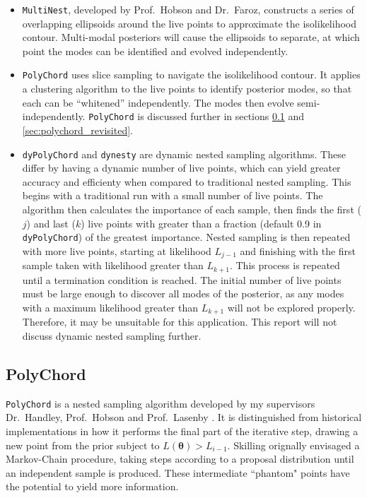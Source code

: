 \documentclass{article}
\begin{document}
\begin{itemize}
  \item \texttt{MultiNest}, developed by Prof.~Hobson and Dr.~Faroz, constructs a series of overlapping ellipsoids around the live points to approximate the isolikelihood contour. Multi-modal posteriors will cause the ellipsoids to separate, at which point the modes can be identified and evolved independently. 
  \item \texttt{PolyChord} uses slice sampling to navigate the isolikelihood contour. It applies a clustering algorithm to the live points to identify posterior modes, so that each can be ``whitened'' independently. The modes then evolve semi-independently. \texttt{PolyChord} is discussed further in sections \ref{sec:poly} and \ref{sec:polychord_revisited}.
  \item \texttt{dyPolyChord} and \texttt{dynesty} are dynamic nested sampling algorithms. These differ by having a dynamic number of live points, which can yield greater accuracy and efficienty when compared to traditional nested sampling. This begins with a traditional run with a small number of live points. The algorithm then calculates the importance of each sample, then finds the first ($j$) and last ($k$) live points with greater than a fraction (default 0.9 in \texttt{dyPolyChord}) of the greatest importance. Nested sampling is then repeated with more live points, starting at likelihood $L_{j-1}$ and finishing with the first sample taken with likelihood greater than $L_{k+1}$. This process is repeated until a termination condition is reached. The initial number of live points must be large enough to discover all modes of the posterior, as any modes with a maximum likelihood greater than $L_{k+1}$ will not be explored properly. Therefore, it may be unsuitable for this application. This report will not discuss dynamic nested sampling further.
\end{itemize}

\subsection{PolyChord}
\label{sec:poly}
\texttt{PolyChord} is a nested sampling algorithm developed by my supervisors Dr.~Handley, Prof.~Hobson and Prof.~Lasenby \cite{PolyChord_1, PolyChord_2}. It is distinguished from historical implementations in how it performs the final part of the iterative step, drawing a new point from the prior subject to $L(\bm\theta)>L_{i-1}$. Skilling orignally envisaged a Markov-Chain procedure, taking steps according to a proposal distribution until an independent sample is produced. These intermediate ``phantom" points have the potential to yield more information.
\end{document}
